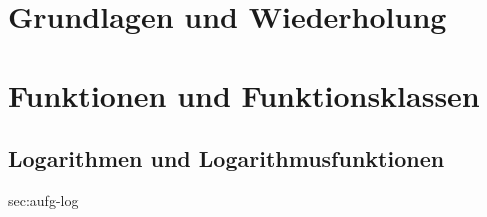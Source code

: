 \documentclass[../Mathe_Aufgaben.tex]{subfiles}
\begin{document}
	\chapter{Grundlagen und Wiederholung}
	\chapter{Funktionen und Funktionsklassen}

	\section{Logarithmen und Logarithmusfunktionen}
	\label{sec:aufg-log}

	\begin{kurzaufgaben}{sec:aufg-log}
	\end{kurzaufgaben}
\end{document}
